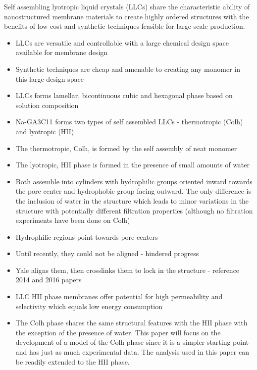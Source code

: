 \documentclass{article}
\begin{document}
	Self assembling lyotropic liquid crystals (LLCs) share the characteristic ability of nanostructured membrane materials to create highly ordered structures with the benefits of low cost and synthetic techniques feasible for large scale production.
	\begin{itemize}
		\item LLCs are versatile and controllable with a large chemical design space available for membrane design
		\item Synthetic techniques are cheap and amenable to creating any monomer in this large design space
		\item LLCs forms lamellar, bicontinuous cubic and hexagonal phase based on solution composition
		\item Na-GA3C11 forms two types of self assembled LLCs - thermotropic (Colh) and lyotropic (HII)
		\item The thermotropic, Colh, is formed by the self assembly of neat monomer
		\item The lyotropic, HII phase is formed in the presence of small amounts of water
		\item Both assemble into cylinders with hydrophilic groups oriented inward towards the pore center and hydrophobic group facing outward. The only difference is the inclusion of water in the structure which leads to minor variations in the structure with potentially different filtration properties (although no filtration experiments have been done on Colh)  
		\item Hydrophilic regions point towards pore centers
		\item Until recently, they could not be aligned - hindered progress
		\item Yale aligns them, then crosslinks them to lock in the structure - reference 2014 and 2016 papers
		\item LLC HII phase membranes offer potential for high permeability and selectivity which equals low energy consumption
		\item The Colh phase shares the same structural features with the HII phase with the exception of the presence of water. This paper will focus on the development of a model of the Colh phase since it is a simpler starting point and has just as much experimental data. The analysis used in this paper can be readily extended to the HII phase. 
	\end{itemize}
	
\end{document}
